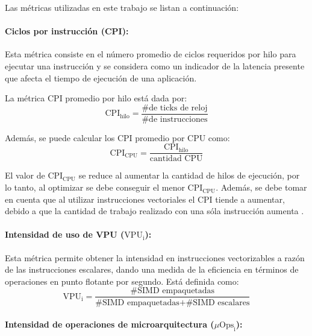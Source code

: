 Las métricas utilizadas en este trabajo se listan a continuación:

\paragraph*{Ciclos por instrucción (CPI):}

Esta métrica consiste en el número promedio de ciclos requeridos por hilo para ejecutar una instrucción y se considera como un indicador de la latencia presente que afecta el tiempo de ejecución de una aplicación.

La métrica CPI promedio por hilo está dada por:
\begin{equation}\label{eq:CPI_metric}
\text{CPI}_{\text{hilo}} = \frac{\text{\# de ticks de reloj}}{\# \text{de instrucciones}}
\end{equation}

Además, se puede calcular los CPI promedio por CPU como:
%
\begin{equation}\label{eq:CPIc_metric}
\text{CPI}_{\text{CPU}} = \frac{\text{CPI}_{\text{hilo}}}{\text{cantidad CPU}}
\end{equation}

El valor de $\text{CPI}_{\text{CPU}} $ se reduce al aumentar la cantidad de hilos de ejecución, por lo tanto, al optimizar se debe conseguir el menor $\text{CPI}_{\text{CPU}} $. Además, se debe tomar en cuenta que al utilizar instrucciones vectoriales el CPI tiende a aumentar, debido a que la cantidad de trabajo realizado con una sóla instrucción aumenta \cite{Jeffers2016315}.

\paragraph*{Intensidad de uso de VPU ($\text{VPU}_{\text{i}}$):}

Esta métrica permite obtener la intensidad en instrucciones vectorizables a razón de las instrucciones escalares, dando una medida de la eficiencia en términos de operaciones en punto flotante por segundo\cite{Jeffers2016315}. Está definida como:
%
\begin{equation}
\text{VPU}_{\text{i}}= \frac{\text{\# SIMD empaquetadas}}{\text{\# SIMD empaquetadas}+\text{\# SIMD escalares}}
\end{equation}

\paragraph*{Intensidad de operaciones de microarquitectura ($\mu\text{Ops}_{\text{i}}$):}

